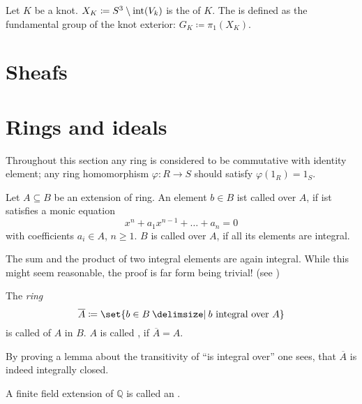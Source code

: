 \begin{definition}
	Let $K$ be a knot. $X_K \coloneqq S^3 \setminus \operatorname{int}(V_k)$ is the  of $K$.
	The  is defined as the fundamental group of the knot exterior: $G_K \coloneqq \pi_1(X_K)$.
\end{definition}

\section{Sheafs} %
\label{sec:sheafs}



\section{Rings and ideals} %
\label{sec:rings_and_ideals}
Throughout this section any ring is considered to be commutative with identity element; any ring homomorphism $\varphi \colon R \to S$ should satisfy $\varphi(1_R) =1_S$.

\begin{definition}[{name=[Integral Elements]{\cite[Def.~2.1]{neukirch}}}]
	Let $A \subseteq B$ be an extension of ring.
	An element $b \in B$ ist called  over $A$, if ist satisfies a monic equation
	\[
		x^n + a_1 x^{n-1} + \ldots + a_n = 0
	\]
	with coefficients $a_i \in A$, $n\ge 1$.
	$B$ is called  over $A$, if all its elements are integral.
\end{definition}

\begin{remark}
	The sum and the product of two integral elements are again integral.
	While this might seem reasonable, the proof is far form being trivial! (see \cite[Prop.~2.2]{neukirch})
\end{remark}

\begin{definition}
	The \emph{ring}
	\[
		\overline{A} \coloneqq \set{b \in B \given b \text{ integral over }A}
	\]
	is called  of $A$ in $B$.
	$A$ is called , if $\overline{A} = A$.
\end{definition}

By proving a lemma about the transitivity of \enquote{is integral over} one sees, that $\overline{A}$ is indeed integrally closed.

\begin{definition}[{name=[algebraic number field]}]
	A finite field extension of $\mathbb{Q}$ is called an .
\end{definition}

